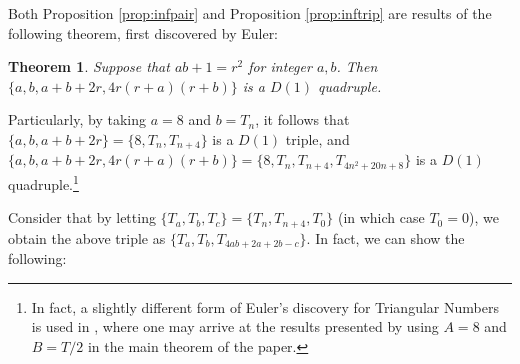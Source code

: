 \documentclass[12pt]{amsart}
\theoremstyle{theorem}
\newtheorem{theorem}{Theorem}
\theoremstyle{definition}
\theoremstyle{plain}
\begin{document}
Both Proposition \ref{prop:infpair} and Proposition \ref{prop:inftrip} are results of the following theorem, first discovered by Euler:

\begin{theorem}
    Suppose that $ab + 1 = r^2$ for integer $a,b$. Then $\{a, b , a + b + 2r, 4r(r+a)(r+b) \}$ is a $D(1)$ quadruple.
\end{theorem}

Particularly, by taking $a = 8$ and $b = T_n$, it follows that $\{a, b, a + b + 2r \} = \{8, T_n, T_{n+4} \}$ is a $D(1)$ triple, and $\{a, b, a + b + 2r, 4r(r+a)(r+b) \} = \{8, T_n, T_{n+4}, T_{4n^2 + 20n + 8} \}$ is a $D(1)$ quadruple.\footnote{In fact, a slightly different form of Euler's discovery for Triangular Numbers is used in \cite{b6.5}, where one may arrive at the results presented by using $A = 8$ and $B = T/2$ in the main theorem of the paper.}


Consider that by letting $\{T_a,T_b,T_c\}=\{T_n,T_{n+4},T_0\}$ (in which case $T_0=0$), we obtain the above triple as $\{T_a,T_b,T_{4ab+2a+2b-c}\}$. 
In fact, we can show the following:
\end{document}

